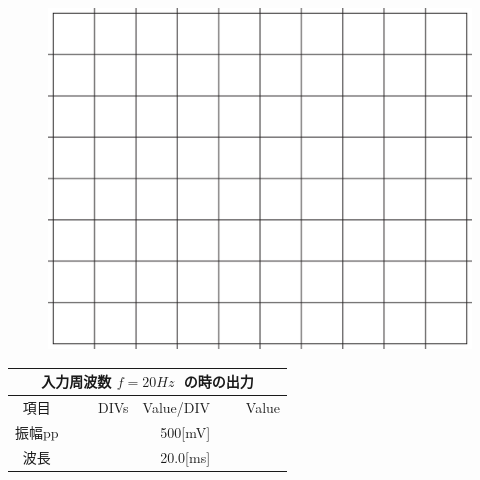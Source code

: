 \documentclass[uplatex,a4paper,11pt,oneside,openany]{jsbook}
\begin{document}
\begin{multicols}{2}
  \begin{figure}[H]
     \centering
      \includegraphics[keepaspectratio, scale=0.28, angle=0]
                  {figs/eps/grid.eps}
                  \label{fig:grid10mV}
  \end{figure}

  \begin{spacing}{1.5}
  \begin{tabular}{|c||r|r|r|}
    \multicolumn{4}{c}{入力周波数 $f=20Hz\;$ の時の出力} \\ \hline
    項目 & DIVs & Value/DIV & Value \\ \hline \hline
    振幅pp & 　　　　 & 500[mV]& 　　　　 \\ \hline
    波長 & 　　　　 & 20.0[ms]& 　　　　 \\ \hline
  \end{tabular}
\end{spacing}
\end{multicols}

\vfill
\end{document}
